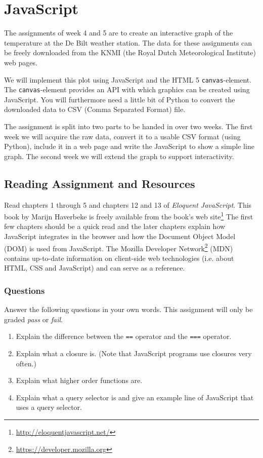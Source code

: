 \chapter{JavaScript}\label{chap:javascript1}
The assignments of week 4 and 5 are to create an interactive graph of
the temperature at the De Bilt weather station. The data for these
assignments can be freely downloaded from the KNMI (the Royal Dutch
Meteorological Institute) web pages.

We will implement this plot using JavaScript and the HTML 5 
\texttt{canvas}-element. The \texttt{canvas}-element provides an
API with which graphics can be created using JavaScript. You will
furthermore need a little bit of Python to convert the downloaded
data to CSV (Comma Separated Format) file. 

The assignment is split into two parts to be handed in over two
weeks. The first week we will acquire the raw data, convert it to
a usable CSV format (using Python), include it in a web page and
write the JavaScript to show a simple line graph. The second week
we will extend the graph to support interactivity.


\section{Reading Assignment and Resources}\label{section:js-questions-1}
Read chapters 1 through 5 and chapters 12 and 13 of \emph{Eloquent 
JavaScript}. This book by Marijn Haverbeke is freely available from
the book's web site\footnote{\url{http://eloquentjavascript.net/}}
The first few chapters should be a quick read and the later chapters
explain how JavaScript integrates in the browser and how the Document
Object Model (DOM) is used from JavaScript. The Mozilla Developer 
Network\footnote{\url{https://developer.mozilla.org}} (MDN) contains 
up-to-date information on client-side web technologies (i.e. about HTML,
CSS and JavaScript) and can serve as a reference. 


\subsection{Questions}
Answer the following questions in your own words. This assignment will
only be graded \emph{pass} or \emph{fail}.
\begin{enumerate}
\item Explain the difference between the \texttt{==} operator and the
      \texttt{===} operator.
\item Explain what a closure is. (Note that JavaScript programs use
      closures very often.)
\item Explain what higher order functions are.
\item Explain what a query selector is and give an example line of 
      JavaScript that uses a query selector.
\end{enumerate}



